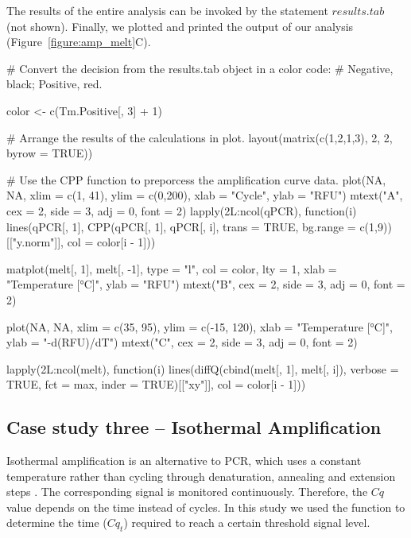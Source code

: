 The results of the entire analysis can be invoked by the statement 
$results.tab$ (not shown). Finally, we plotted and printed the output of our analysis 
(Figure~\ref{figure:amp_melt}C).

\begin{example}
# Convert the decision from the results.tab object in a color code:
# Negative, black; Positive, red.

color <- c(Tm.Positive[, 3] + 1)

# Arrange the results of the calculations in plot.
layout(matrix(c(1,2,1,3), 2, 2, byrow = TRUE))

# Use the CPP function to preporcess the amplification curve data.
plot(NA, NA, xlim = c(1, 41), ylim = c(0,200), xlab = "Cycle", ylab = "RFU")
mtext("A", cex = 2, side = 3, adj = 0, font = 2)
lapply(2L:ncol(qPCR), function(i) 
  lines(qPCR[, 1], 
        CPP(qPCR[, 1], qPCR[, i], trans = TRUE, 
            bg.range = c(1,9))[["y.norm"]],
        col = color[i - 1]))

matplot(melt[, 1], melt[, -1], type = "l", col = color, 
        lty = 1, xlab = "Temperature [°C]", ylab = "RFU")
mtext("B", cex = 2, side = 3, adj = 0, font = 2)

plot(NA, NA, xlim = c(35, 95), ylim = c(-15, 120), xlab = "Temperature [°C]", 
     ylab = "-d(RFU)/dT")
mtext("C", cex = 2, side = 3, adj = 0, font = 2)

lapply(2L:ncol(melt), function(i)
  lines(diffQ(cbind(melt[, 1], melt[, i]), verbose = TRUE, 
              fct = max, inder = TRUE)[["xy"]], col = color[i - 1]))
\end{example}

\subsection{Case study three -- Isothermal Amplification}

Isothermal amplification is an alternative to PCR, which uses a constant 
temperature rather than cycling through denaturation, annealing and extension 
steps \citep{rodiger_nucleic_2014}. The corresponding signal is monitored 
continuously. Therefore, the $Cq$ value depends on the time instead of cycles. 
In this study we used the  function to determine the time 
($Cq_{t}$) required to reach a certain threshold signal level.

